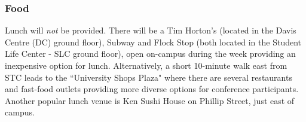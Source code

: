 
\subsubsection{Food}

Lunch will \emph{not} be provided. There will be a Tim Horton's (located in the Davis Centre (DC) ground floor), Subway and Flock Stop (both located in the Student Life Center - SLC ground floor), open on-campus during the week providing an inexpensive option for lunch.  
Alternatively, a short 10-minute walk east from STC leads to the ``University Shops Plaza" where there are several restaurants and fast-food outlets providing more diverse options for conference participants. Another popular lunch venue is Ken Sushi House on Phillip Street, just east of campus.

\iffalse
{}

